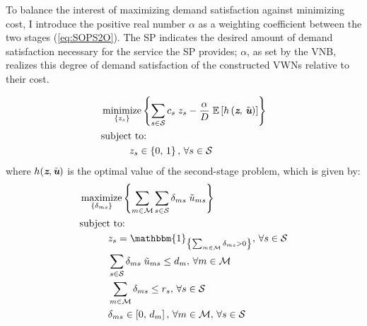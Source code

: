 \documentclass[12pt,dvipsnames]{report}
\newcommand{\ind}[1]{\mathbbm{1}_{\left\{ #1 \right\}}}
\DeclareMathOperator*{\argmin}{minimize}
\DeclareMathOperator*{\argmax}{maximize}
\begin{document}
To balance the interest of maximizing demand satisfaction against minimizing cost, I introduce the positive real number $\alpha$ as a weighting coefficient between the two stages (\cref{eq:SOPS2O}).  The SP indicates the desired amount of demand satisfaction necessary for the service the SP provides; $\alpha$, as set by the VNB, realizes this degree of demand satisfaction of the constructed VWNs relative to their cost.

\begin{tcolorbox}[floatplacement = !htp, float, title = Two-Stage Stochastic Optimization Program for BS Selection and Adaptive Slicing]
\begin{align}
& \argmin_{\left\{ z_s \right\}} \left\{ \sum_{s \in \mathcal{S}} c_s \; z_s - \frac{\alpha}{D} \; \mathbb{E}\left[ h\left( \textit{\textbf{z}},\, \tilde{\textit{\textbf{u}}} \right) \right] \right\} \label{eq:SOPS1O}\\
& \text{subject to:}  \nonumber \\
& \hspace{0.4in} z_s \in \left\{ 0,\, 1 \right\},\, \forall s \in \mathcal{S} \label{eq:SOPS1C1}
\end{align}
where $h(\textit{\textbf{z}}, \tilde{\textit{\textbf{u}}})$ is the optimal value of the second-stage problem, which is given by:
\begin{align}
& \argmax_{\left\{ \delta_{ms} \right\}} \left\{ \sum_{m \in \mathcal{M}} \sum_{s \in \mathcal{S}} \delta_{ms} \; \tilde{u}_{ms} \right\} \label{eq:SOPS2O}\\
& \text{subject to:}  \nonumber \\
& \hspace{0.4in} z_s = \ind{\sum_{m \in \mathcal{M}} \delta_{ms} > 0},\, \forall s \in \mathcal{S} \label{eq:SOPS2C1}\\
& \hspace{0.4in} \sum_{s \in \mathcal{S}} \delta_{ms} \; \tilde{u}_{ms} \leq d_m,\, \forall m \in \mathcal{M} \label{eq:SOPS2C2}\\
& \hspace{0.4in} \sum_{m \in \mathcal{M}} \delta_{ms} \leq r_s,\, \forall s \in \mathcal{S} \label{eq:SOPS2C3}\\
& \hspace{0.4in} \delta_{ms} \in \left[ 0,\, d_m \right],\, \forall m \in \mathcal{M},\, \forall s \in \mathcal{S} \label{eq:SOPS2C4}
\end{align}
\end{tcolorbox}
\end{document}
